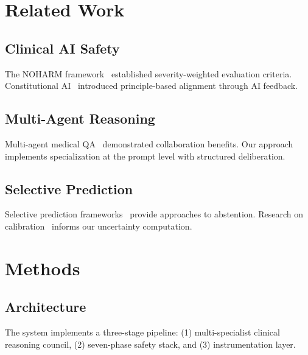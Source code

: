 \documentclass[10pt,twocolumn]{article}
\begin{document}
\section{Related Work}

\subsection{Clinical AI Safety}

The NOHARM framework~\cite{chen2025noharm} established severity-weighted evaluation criteria. Constitutional AI~\cite{bai2022constitutional} introduced principle-based alignment through AI feedback.

\subsection{Multi-Agent Reasoning}

Multi-agent medical QA~\cite{li2023multiagent} demonstrated collaboration benefits. Our approach implements specialization at the prompt level with structured deliberation.

\subsection{Selective Prediction}

Selective prediction frameworks~\cite{kamath2020selective} provide approaches to abstention. Research on calibration~\cite{guo2017calibration} informs our uncertainty computation.

\section{Methods}

\subsection{Architecture}

The system implements a three-stage pipeline: (1) multi-specialist clinical reasoning council, (2) seven-phase safety stack, and (3) instrumentation layer.


\end{document}
